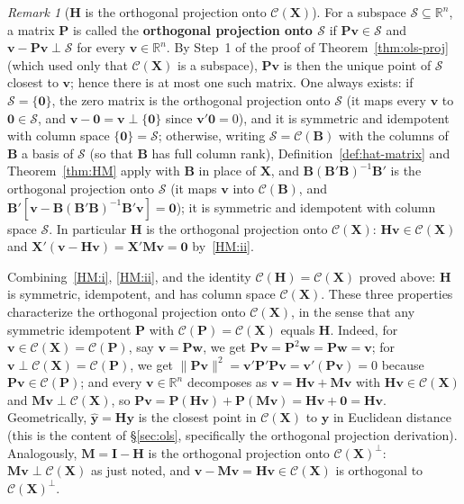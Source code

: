 \documentclass[14pt]{extarticle}
\theoremstyle{plain}
\theoremstyle{definition}
\theoremstyle{remark}
\newtheorem{remark}[theorem]{Remark}
\newcommand{\bX}{\mathbf{X}}
\newcommand{\by}{\mathbf{y}}
\newcommand{\bI}{\mathbf{I}}
\newcommand{\bH}{\mathbf{H}}
\newcommand{\bM}{\mathbf{M}}
\newcommand{\bzero}{\mathbf{0}}
\newcommand{\bw}{\mathbf{w}}
\newcommand{\bP}{\mathbf{P}}
\newcommand{\bv}{\mathbf{v}}
\newcommand{\Real}{\mathbb{R}}
\newcommand{\calC}{\mathcal{C}}
\begin{document}
\begin{remark}[$\bH$ is the orthogonal projection onto $\calC(\bX)$]\label{rem:hat-projection}
For a subspace $\mathcal{S} \subseteq \Real^n$, a matrix $\bP$ is called the \textbf{orthogonal projection onto $\mathcal{S}$} if $\bP\bv \in \mathcal{S}$ and $\bv - \bP\bv \perp \mathcal{S}$ for every $\bv \in \Real^n$. By Step~1 of the proof of Theorem~\ref{thm:ols-proj} (which used only that $\calC(\bX)$ is a subspace), $\bP\bv$ is then the unique point of $\mathcal{S}$ closest to $\bv$; hence there is at most one such matrix. One always exists: if $\mathcal{S} = \{\bzero\}$, the zero matrix is the orthogonal projection onto $\mathcal{S}$ (it maps every $\bv$ to $\bzero \in \mathcal{S}$, and $\bv - \bzero = \bv \perp \{\bzero\}$ since $\bv'\bzero = 0$), and it is symmetric and idempotent with column space $\{\bzero\} = \mathcal{S}$; otherwise, writing $\mathcal{S} = \calC(\mathbf{B})$ with the columns of $\mathbf{B}$ a basis of $\mathcal{S}$ (so that $\mathbf{B}$ has full column rank), Definition~\ref{def:hat-matrix} and Theorem~\ref{thm:HM} apply with $\mathbf{B}$ in place of $\bX$, and $\mathbf{B}(\mathbf{B}'\mathbf{B})^{-1}\mathbf{B}'$ is the orthogonal projection onto $\mathcal{S}$ (it maps $\bv$ into $\calC(\mathbf{B})$, and $\mathbf{B}'[\bv - \mathbf{B}(\mathbf{B}'\mathbf{B})^{-1}\mathbf{B}'\bv] = \bzero$); it is symmetric and idempotent with column space $\mathcal{S}$. In particular $\bH$ is the orthogonal projection onto $\calC(\bX)$: $\bH\bv \in \calC(\bX)$ and $\bX'(\bv - \bH\bv) = \bX'\bM\bv = \bzero$ by~\ref{HM:ii}.

Combining~\ref{HM:i}, \ref{HM:ii}, and the identity $\calC(\bH) = \calC(\bX)$ proved above: $\bH$ is symmetric, idempotent, and has column space $\calC(\bX)$. These three properties characterize the orthogonal projection onto $\calC(\bX)$, in the sense that any symmetric idempotent $\bP$ with $\calC(\bP) = \calC(\bX)$ equals $\bH$. Indeed, for $\bv \in \calC(\bX) = \calC(\bP)$, say $\bv = \bP\bw$, we get $\bP\bv = \bP^2\bw = \bP\bw = \bv$; for $\bv \perp \calC(\bX) = \calC(\bP)$, we get $\|\bP\bv\|^2 = \bv'\bP'\bP\bv = \bv'(\bP\bv) = 0$ because $\bP\bv \in \calC(\bP)$; and every $\bv \in \Real^n$ decomposes as $\bv = \bH\bv + \bM\bv$ with $\bH\bv \in \calC(\bX)$ and $\bM\bv \perp \calC(\bX)$, so $\bP\bv = \bP(\bH\bv) + \bP(\bM\bv) = \bH\bv + \bzero = \bH\bv$. Geometrically, $\hat{\by} = \bH\by$ is the closest point in $\calC(\bX)$ to $\by$ in Euclidean distance (this is the content of \S\ref{sec:ols}, specifically the orthogonal projection derivation). Analogously, $\bM = \bI - \bH$ is the orthogonal projection onto $\calC(\bX)^\perp$: $\bM\bv \perp \calC(\bX)$ as just noted, and $\bv - \bM\bv = \bH\bv \in \calC(\bX)$ is orthogonal to $\calC(\bX)^\perp$.
\end{remark}
\end{document}
